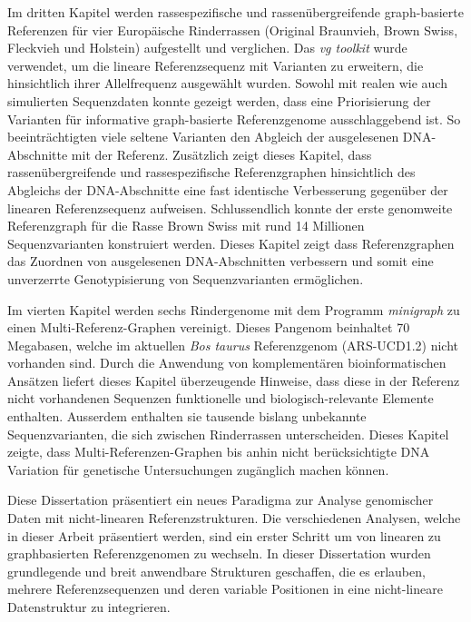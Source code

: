 \documentclass[11 pt, a4paper, notitlepage, twoside]{report}
\begin{document}
Im dritten Kapitel werden rassespezifische und rassenübergreifende graph-basierte Referenzen für vier Europäische Rinderrassen (Original Braunvieh, Brown Swiss, Fleckvieh und Holstein) aufgestellt und verglichen. Das \emph{vg toolkit} wurde verwendet, um die lineare Referenzsequenz mit Varianten zu erweitern, die hinsichtlich ihrer Allelfrequenz ausgewählt wurden. Sowohl mit realen wie auch simulierten Sequenzdaten konnte gezeigt werden, dass eine Priorisierung der Varianten für informative graph-basierte Referenzgenome ausschlaggebend ist. So beeinträchtigten viele seltene Varianten den Abgleich der ausgelesenen DNA-Abschnitte mit der Referenz. Zusätzlich zeigt dieses Kapitel, dass rassenübergreifende und rassespezifische Referenzgraphen hinsichtlich des Abgleichs der DNA-Abschnitte eine fast identische Verbesserung gegenüber der linearen Referenzsequenz aufweisen. Schlussendlich konnte der erste genomweite Referenzgraph für die Rasse Brown Swiss mit rund 14 Millionen Sequenzvarianten konstruiert werden. Dieses Kapitel zeigt dass Referenzgraphen das Zuordnen von ausgelesenen DNA-Abschnitten verbessern und somit eine unverzerrte Genotypisierung von Sequenzvarianten ermöglichen.

\thispagestyle{plain}

Im vierten Kapitel werden sechs Rindergenome mit dem Programm \emph{minigraph} zu einen Multi-Referenz-Graphen vereinigt. Dieses Pangenom beinhaltet 70 Megabasen, welche im aktuellen \emph{Bos taurus} Referenzgenom (ARS-UCD1.2) nicht vorhanden sind. Durch die Anwendung von komplementären bioinformatischen Ansätzen liefert dieses Kapitel überzeugende Hinweise, dass diese in der Referenz nicht vorhandenen Sequenzen funktionelle und biologisch-relevante Elemente enthalten. Ausserdem enthalten sie tausende bislang unbekannte Sequenzvarianten, die  sich zwischen  Rinderrassen  unterscheiden. Dieses Kapitel zeigte, dass Multi-Referenzen-Graphen bis anhin nicht berücksichtigte DNA Variation für genetische Untersuchungen zugänglich machen können.

Diese Dissertation präsentiert ein neues Paradigma zur Analyse genomischer Daten mit nicht-linearen Referenzstrukturen. Die verschiedenen Analysen, welche in dieser Arbeit präsentiert werden, sind ein erster Schritt um von linearen zu graphbasierten Referenzgenomen zu wechseln. In dieser Dissertation wurden grundlegende und breit anwendbare Strukturen geschaffen, die es erlauben, mehrere Referenzsequenzen und deren variable Positionen in eine nicht-lineare Datenstruktur zu integrieren.
\end{document}
